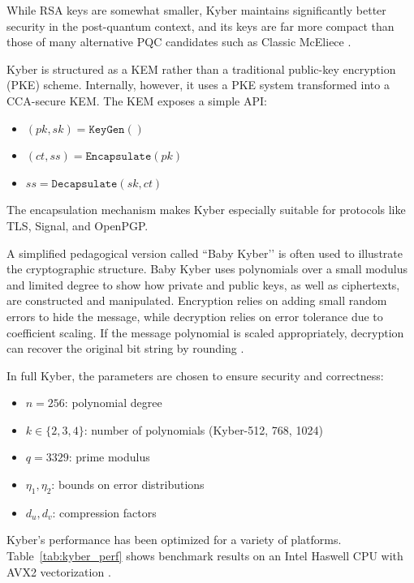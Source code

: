While RSA keys are somewhat smaller, Kyber maintains significantly better security in the post-quantum context, and its keys are far more compact than those of many alternative PQC candidates such as Classic McEliece \cite{kyber2021}. %

Kyber is structured as a KEM rather than a traditional public-key encryption (PKE) scheme. Internally, however, it uses a PKE system transformed into a CCA-secure KEM. The KEM exposes a simple API:
\begin{itemize}
    \item $(\mathit{pk}, \mathit{sk}) = \texttt{KeyGen}()$
    \item $(\mathit{ct}, \mathit{ss}) = \texttt{Encapsulate}(\mathit{pk})$
    \item $\mathit{ss} = \texttt{Decapsulate}(\mathit{sk}, \mathit{ct})$
\end{itemize}

The encapsulation mechanism makes Kyber especially suitable for protocols like TLS, Signal, and OpenPGP. %

A simplified pedagogical version called ``Baby Kyber’’ is often used to illustrate the cryptographic structure. Baby Kyber uses polynomials over a small modulus and limited degree to show how private and public keys, as well as ciphertexts, are constructed and manipulated. Encryption relies on adding small random errors to hide the message, while decryption relies on error tolerance due to coefficient scaling. If the message polynomial is scaled appropriately, decryption can recover the original bit string by rounding \cite{kyber2021}. %

In full Kyber, the parameters are chosen to ensure security and correctness:
\begin{itemize}
    \item $n = 256$: polynomial degree
    \item $k \in \{2, 3, 4\}$: number of polynomials (Kyber-512, 768, 1024)
    \item $q = 3329$: prime modulus
    \item $\eta_1, \eta_2$: bounds on error distributions
    \item $d_u, d_v$: compression factors
\end{itemize}

Kyber’s performance has been optimized for a variety of platforms. Table~\ref{tab:kyber_perf} shows benchmark results on an Intel Haswell CPU with AVX2 vectorization \cite{kyber2024}. %

